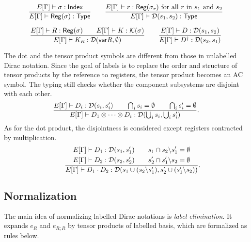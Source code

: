 \[
    \frac{E[\Gamma] \vdash  \sigma : \mathsf{Index}}{E[\Gamma] \vdash \mathsf{Reg}(\sigma) : \mathsf{Type}}
    \qquad
    \frac{E[\Gamma] \vdash r : \mathsf{Reg}(\sigma_r) \text{ for all $r$ in $s_1$ and $s_2$} }{E[\Gamma] \vdash \mathcal{D}(s_1, s_2) : \textsf{Type}} 
\]

\[
    \frac{E[\Gamma] \vdash R : \mathsf{Reg}(\sigma)\qquad E[\Gamma] \vdash K : \mathcal{K}(\sigma)}{E[\Gamma] \vdash K_R : \mathcal{D}(\mathsf{var} R, \emptyset)}
    \qquad
    \frac{E[\Gamma] \vdash D : \mathcal{D}(s_1,s_2)}{E[\Gamma] \vdash D^\dagger : \mathcal{D}(s_2,s_1)}
\]

The dot and the tensor product symbols are different from those in unlabelled Dirac notation. Since the goal of labels is to replace the order and structure of tensor products by the reference to registers, the tensor product becomes an AC symbol. The typing still checks whether the component subsystems are disjoint with each other.
\[
    \frac{
        E[\Gamma] \vdash D_i : \mathcal{D}(s_i,s_i') \qquad
        \bigcap_i s_i = \emptyset \qquad
        \bigcap_i s_i' = \emptyset
    }
    {E[\Gamma] \vdash D_1 \otimes \cdots \otimes D_i : \mathcal{D}(\bigcup_i s_i, \bigcup_i s_i')}.
\]
As for the dot product, the disjointness is considered except registers contracted by multiplication.
\[
    \qquad
    \frac{
        \begin{aligned}
            E[\Gamma] \vdash D_1 : \mathcal{D}(s_1,s_1') \\
            E[\Gamma] \vdash D_2 : \mathcal{D}(s_2,s_2')
        \end{aligned}
        \qquad 
        \begin{aligned}
            s_1 \cap s_2 \backslash s_1' = \emptyset \\
            s_2' \cap s_1' \backslash s_2 = \emptyset
        \end{aligned}
    }
    {E[\Gamma] \vdash D_1\cdot D_2 : \mathcal{D}(s_1 \cup (s_2\backslash s_1'), s_2' \cup (s_1'\backslash s_2))}.
\]

\subsection{Normalization}
The main idea of normalizing labelled Dirac notations is \textit{label elimination}. It expands $e_R$ and $e_{R;R}$ by tensor products of labelled basis, which are formalized as rules below.

